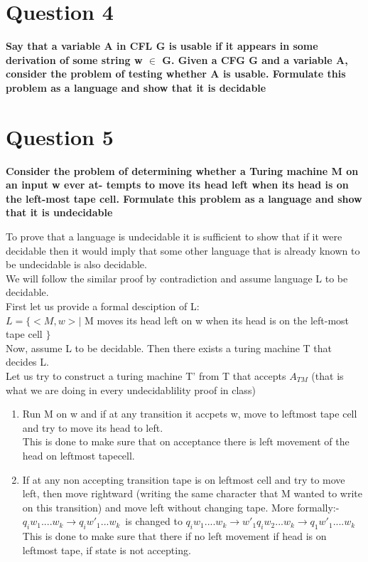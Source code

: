 \documentclass{article}
\begin{document}
\pagebreak


\section{Question 4}

\textbf{Say that a variable A in CFL G is usable if it appears in some derivation of some string
w $\in$ G. Given a CFG G and a variable A, consider the problem of testing whether A is
usable. Formulate this problem as a language and show that it is decidable\\}

\pagebreak


\section{Question 5}

\textbf{Consider the problem of determining whether a Turing machine M on an input w ever at-
tempts to move its head left when its head is on the left-most tape cell. Formulate this
problem as a language and show that it is undecidable\\}

To prove that a language is undecidable it is sufficient to show that if it were decidable then it would imply
that some other language that is already known to be undecidable is also decidable.\\
We will follow the similar proof by contradiction and assume language L to be decidable.\\
First let us provide a formal desciption of L:\\
$L = \{ <M,w> | $ M moves its head left on w when its head is on the left-most tape cell $ \}$\\

Now, assume L to be decidable. Then there exists a turing machine T that decides L.\\
Let us try to construct a turing machine T' from T that accepts $A_{TM}$ (that is what we are doing in every undecidablility proof in class)
\begin{enumerate}
    \item Run M on w and if at any transition it accpets w, move to leftmost tape cell and try to move its head to left.\\
        This is done to make sure that on acceptance there is left movement of the head on leftmost tapecell.\\
    \item If at any non accepting transition tape is on leftmost cell and try to move left, then move rightward (writing the same character that M wanted to write on this transition) and move 
            left without changing tape. More formally:- \\
            $q_iw_1....w_k \rightarrow q_iw'_1...w_k $\ is changed to $q_iw_1....w_k \rightarrow w'_1q_iw_2...w_k \rightarrow q_1w'_1....w_k$\\
            This is done to make sure that there if no left movement if head is on leftmost tape, if state is not accepting.
\end{enumerate} 
\end{document}
